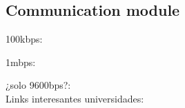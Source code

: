\subsection{Communication module}





100kbps: %

1mbps: %

¿solo 9600bps?: %
\\
Links interesantes universidades:
\\


